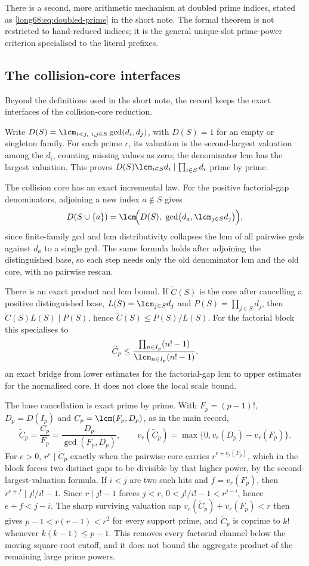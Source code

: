 There is a second, more arithmetic mechanism at doubled prime indices, stated
as \eqref{long68:eq:doubled-prime} in the short note.  The formal theorem is not
restricted to hand-reduced indices; it is the general unique-slot prime-power
criterion specialised to the literal prefixes.

\subsection{The collision-core interfaces}\label{long68:sec:ext-collision}

Beyond the definitions used in the short note, the record keeps the exact
interfaces of the collision-core reduction.

Write $D(S)=\lcm_{i<j,\ i,j\in S}\gcd(d_i,d_j)$, with $D(S)=1$
for an empty or singleton family. For each prime $r$, its valuation is the
second-largest valuation among the $d_i$, counting missing values as zero;
the denominator lcm has the largest valuation. This proves
$D(S)\lcm_{i\in S}d_i\mid\prod_{i\in S}d_i$ prime by prime.

The collision core has an exact incremental law. For the positive
factorial-gap denominators, adjoining a new index $a\notin S$ gives
\[
 D(S\cup\{a\})=\lcm\!\Bigl(D(S),\ \gcd\bigl(d_a,\lcm_{j\in S}d_j\bigr)\Bigr),
\]
since finite-family gcd and lcm distributivity collapses the lcm of all
pairwise gcds against $d_a$ to a single gcd.  The same formula holds after
adjoining the distinguished base, so each step needs only the old denominator
lcm and the old core, with no pairwise rescan.

There is an exact product and lcm bound.  If $\widetilde C(S)$ is the core
after cancelling a positive distinguished base, $L(S)=\lcm_{j\in S}d_j$ and
$P(S)=\prod_{j\in S}d_j$, then $\widetilde C(S)L(S)\mid P(S)$, hence
$\widetilde C(S)\le P(S)/L(S)$.  For the factorial block this specialises to
\[
 \widetilde C_p\le\frac{\prod_{n\in I_p}(n!-1)}{\lcm_{n\in I_p}(n!-1)},
\]
an exact bridge from lower estimates for the factorial-gap lcm to upper
estimates for the normalised core.  It does not close the local scale bound.

The base cancellation is exact prime by prime. With $F_p=(p-1)!$,
$D_p=D(I_p)$ and $C_p=\lcm(F_p,D_p)$, as in the main record,
\[
 \widetilde C_p=\frac{C_p}{F_p}=\frac{D_p}{\gcd(F_p,D_p)},\qquad
 v_r(\widetilde C_p)=\max\{0,v_r(D_p)-v_r(F_p)\} .
\]
For $e>0$, $r^e\mid\widetilde C_p$ exactly when the pairwise core carries
$r^{e+v_r(F_p)}$, which in the block forces two distinct gaps to be divisible
by that higher power, by the second-largest-valuation formula. If $i<j$
are two such hits and $f=v_r(F_p)$, then
$r^{e+f}\mid j!/i!-1$. Since $r\mid j!-1$ forces $j<r$,
$0<j!/i!-1<r^{j-i}$, hence $e+f<j-i$.
The sharp surviving valuation cap
$v_r(\widetilde C_p)+v_r(F_p)<r$ then gives $p-1<r(r-1)<r^2$ for every
support prime, and $\widetilde C_p$ is coprime to $k!$ whenever
$k(k-1)\le p-1$.  This removes every factorial channel below the moving
square-root cutoff, and it does not bound the aggregate product of the
remaining large prime powers.

